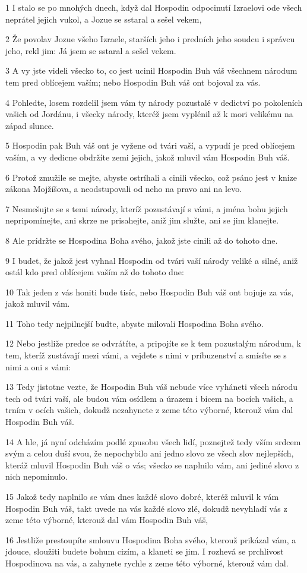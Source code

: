 \par 1 I stalo se po mnohých dnech, když dal Hospodin odpocinutí Izraelovi ode všech neprátel jejich vukol, a Jozue se sstaral a sešel vekem,
\par 2 Že povolav Jozue všeho Izraele, starších jeho i predních jeho soudcu i správcu jeho, rekl jim: Já jsem se sstaral a sešel vekem.
\par 3 A vy jste videli všecko to, co jest ucinil Hospodin Buh váš všechnem národum tem pred oblícejem vaším; nebo Hospodin Buh váš ont bojoval za vás.
\par 4 Pohledte, losem rozdelil jsem vám ty národy pozustalé v dedictví po pokoleních vašich od Jordánu, i všecky národy, kteréž jsem vyplénil až k mori velikému na západ slunce.
\par 5 Hospodin pak Buh váš ont je vyžene od tvári vaší, a vypudí je pred oblícejem vaším, a vy dedicne obdržíte zemi jejich, jakož mluvil vám Hospodin Buh váš.
\par 6 Protož zmužile se mejte, abyste ostríhali a cinili všecko, což psáno jest v knize zákona Mojžíšova, a neodstupovali od neho na pravo ani na levo.
\par 7 Nesmešujte se s temi národy, kteríž pozustávají s vámi, a jména bohu jejich nepripomínejte, ani skrze ne prisahejte, aniž jim služte, ani se jim klanejte.
\par 8 Ale prídržte se Hospodina Boha svého, jakož jste cinili až do tohoto dne.
\par 9 I budet, že jakož jest vyhnal Hospodin od tvári vaší národy veliké a silné, aniž ostál kdo pred oblícejem vaším až do tohoto dne:
\par 10 Tak jeden z vás honiti bude tisíc, nebo Hospodin Buh váš ont bojuje za vás, jakož mluvil vám.
\par 11 Toho tedy nejpilnejší budte, abyste milovali Hospodina Boha svého.
\par 12 Nebo jestliže predce se odvrátíte, a pripojíte se k tem pozustalým národum, k tem, kteríž zustávají mezi vámi, a vejdete s nimi v príbuzenství a smísíte se s nimi a oni s vámi:
\par 13 Tedy jistotne vezte, že Hospodin Buh váš nebude více vyháneti všech národu tech od tvári vaší, ale budou vám osídlem a úrazem i bicem na bocích vašich, a trním v ocích vašich, dokudž nezahynete z zeme této výborné, kterouž vám dal Hospodin Buh váš.
\par 14 A hle, já nyní odcházím podlé zpusobu všech lidí, poznejtež tedy vším srdcem svým a celou duší svou, že nepochybilo ani jedno slovo ze všech slov nejlepších, kteráž mluvil Hospodin Buh váš o vás; všecko se naplnilo vám, ani jediné slovo z nich nepominulo.
\par 15 Jakož tedy naplnilo se vám dnes každé slovo dobré, kteréž mluvil k vám Hospodin Buh váš, takt uvede na vás každé slovo zlé, dokudž nevyhladí vás z zeme této výborné, kterouž dal vám Hospodin Buh váš,
\par 16 Jestliže prestoupíte smlouvu Hospodina Boha svého, kterouž prikázal vám, a jdouce, sloužiti budete bohum cizím, a klaneti se jim. I rozhevá se prchlivost Hospodinova na vás, a zahynete rychle z zeme této výborné, kterouž vám dal.

